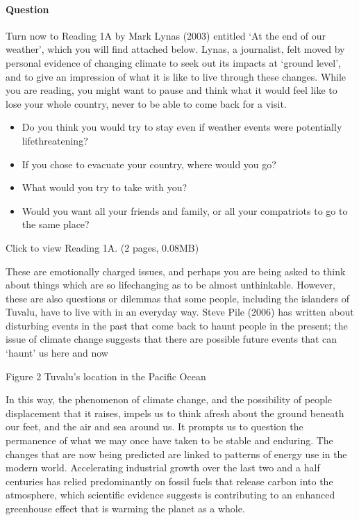 \documentclass[letterpaper,10pt,english]{sphinxmanual}
\let\sphinxpxdimen\pdfpxdimen\else\newdimen\sphinxpxdimen
\begin{document}
\paragraph{Question}
\label{\detokenize{content/session_00/Part_00_01:Question}}
Turn now to Reading 1A by Mark Lynas (2003) entitled ‘At the end of our weather’, which you will find attached below. Lynas, a journalist, felt moved by personal evidence of changing climate to seek out its impacts at ‘ground level’, and to give an impression of what it is like to live through these changes. While you are reading, you might want to pause and think what it would feel like to lose your whole country, never to be able to come back for a visit.
\begin{itemize}
\item {} 
Do you think you would try to stay even if weather events were potentially life\sphinxhyphen{}threatening?

\item {} 
If you chose to evacuate your country, where would you go?

\item {} 
What would you try to take with you?

\item {} 
Would you want all your friends and family, or all your compatriots to go to the same place?

\end{itemize}

Click to view Reading 1A. (2 pages, 0.08MB)

These are emotionally charged issues, and perhaps you are being asked to think about things which are so life\sphinxhyphen{}changing as to be almost unthinkable. However, these are also questions or dilemmas that some people, including the islanders of Tuvalu, have to live with in an everyday way. Steve Pile (2006) has written about disturbing events in the past that come back to haunt people in the present; the issue of climate change suggests that there are possible future events that can ‘haunt’ us here
and now

\sphinxincludegraphics[width=571\sphinxpxdimen,height=400\sphinxpxdimen]{{dd205_3_002i}.jpg}

Figure 2 Tuvalu’s location in the Pacific Ocean

In this way, the phenomenon of climate change, and the possibility of people displacement that it raises, impels us to think afresh about the ground beneath our feet, and the air and sea around us. It prompts us to question the permanence of what we may once have taken to be stable and enduring. The changes that are now being predicted are linked to patterns of energy use in the modern world. Accelerating industrial growth over the last two and a half centuries has relied predominantly on fossil
fuels that release carbon into the atmosphere, which scientific evidence suggests is contributing to an enhanced greenhouse effect that is warming the planet as a whole.
\end{document}
